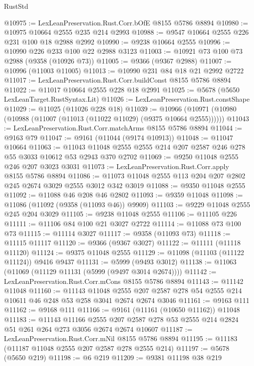 \begin{lexlean}{RustStd}
\begin{coremodule}
@10975 := LexLeanPreservation.Rust.Corr.bOfE @8155 @5786 @8894
@10980 := @10975 @10664 @2555 @235 @214 @2993
@10988 := @9547 @10664 @2555 @226 @231 @100 @18 @2988 @2992
@10990 := @9238 @10664 @2555
@10996 := @10990 @226 @233 @100 @22 @2988 @3123
@11003 := @10921 @73 @100 @73 @2988 (@9358 (@10926 @73))
@11005 := @9366 (@9367 @2988)
@11007 := @10996 (@11003 @11005)
@11013 := @10990 @231 @84 @18 @21 @2992 @2722
@11017 := LexLeanPreservation.Rust.Corr.buildConst @8155 @5786 @8894
@11022 := @11017 @10664 @2555 @228 @18 @2991
@11025 := @5678 (@5650 LexLeanTarget.RustSyntax.Lit)
@11026 := LexLeanPreservation.Rust.constShape
@11029 := @11025 (@11026 @228 @18)
@11039 := @10966 (@10971 (@10980 (@10988 (@11007 (@11013 (@11022 @11029) (@9375 @10664 @2555))))))
@11043 := LexLeanPreservation.Rust.Corr.matchArms @8155 @5786 @8894
@11044 := @9163 @79
@11047 := @9161 (@11044 (@9174 @10913))
@11048 := @11047 @10664
@11063 := @11043 @11048 @2555 @2555 @214 @207 @2587 @246 @278 @55 @3033 @10612 @53 @2943 @370 @2702
@11069 := @9250 @11048 @2555 @246 @207 @3023 @3031
@11073 := LexLeanPreservation.Rust.Corr.apply @8155 @5786 @8894
@11086 := @11073 @11048 @2555 @113 @204 @207 @2802 @245 @2674 @3029 @2555 @3012 @342 @3019
@11088 := @9350 @11048 @2555
@11092 := @11088 @46 @208 @46 @2802
@11093 := @9359 @11048
@11098 := @11086 (@11092 (@9358 (@11093 @46)) @9909)
@11103 := @9229 @11048 @2555 @245 @204 @3029
@11105 := @9238 @11048 @2555
@11106 := @11105 @226
@11111 := @11106 @84 @100 @21 @3027 @2722
@11114 := @11088 @73 @100 @73
@11115 := @11114 @3027
@11117 := @9358 (@11093 @73)
@11118 := @11115 @11117
@11120 := @9366 (@9367 @3027)
@11122 := @11111 (@11118 @11120)
@11124 := @9375 @11048 @2555
@11129 := @11098 (@11103 (@11122 @11124)) @9416 @9437
@11131 := @5999 (@9493 @3012)
@11138 := @11063 (@11069 (@11129 @11131 (@5999 (@9497 @3014 @2674))))
@11142 := LexLeanPreservation.Rust.Corr.mCons @8155 @5786 @8894
@11143 := @11142 @11048
@11160 := @11143
    @11048
    @2555
    @207
    @2587
    @278
    @54
    @2555
    @214
    @10611
    @46
    @248
    @53
    @258
    @3041
    @2674
    @2674
    @3046
@11161 := @9163 @111
@11162 := @9168 @111
@11166 := @9161 (@11161 (@10650 @11162)) @11048
@11183 := @11143
    @11166
    @2555
    @207
    @2587
    @278
    @53
    @2555
    @214
    @2824
    @51
    @261
    @264
    @273
    @3056
    @2674
    @2674
    @10607
@11187 := LexLeanPreservation.Rust.Corr.mNil @8155 @5786 @8894
@11195 := @11183 (@11187 @11048 @2555 @207 @2587 @278 @2555 @214)
@11197 := @5678 (@5650 @219)
@11198 := @6 @219
@11209 := @9381
    @11198
    @38
    @219

\end{coremodule}
\end{lexlean}
